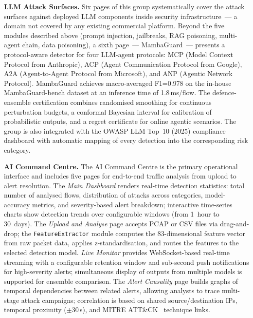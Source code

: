 \noindent\textbf{LLM Attack Surfaces.} Six pages of this group
systematically cover the attack surfaces against deployed LLM
components inside security infrastructure~--- a domain not
covered by any existing commercial platform. Beyond the five
modules described above (prompt injection, jailbreaks, RAG
poisoning, multi-agent chain, data poisoning), a sixth page~---
\textsf{MambaGuard}~--- presents a protocol-aware detector for
four LLM-agent protocols: MCP (Model Context Protocol from
Anthropic), ACP (Agent Communication Protocol from Google), A2A
(Agent-to-Agent Protocol from Microsoft), and ANP (Agentic
Network Protocol). \textsf{MambaGuard} achieves macro-averaged
F1=0.978 on the in-house MambaGuard-bench dataset at an inference
time of 1.8\,ms/flow. The defence-ensemble certification combines
randomised smoothing for continuous perturbation budgets, a
conformal Bayesian interval for calibration of probabilistic
outputs, and a regret certificate for online agentic scenarios.
The group is also integrated with the OWASP LLM Top~10 (2025)
compliance dashboard with automatic mapping of every detection
into the corresponding risk category.

\noindent\textbf{AI Command Centre.} The AI Command Centre is the
primary operational interface and includes five pages for
end-to-end traffic analysis from upload to alert resolution. The
\emph{Main Dashboard} renders real-time detection statistics:
total number of analysed flows, distribution of attacks across
categories, model-accuracy metrics, and severity-based alert
breakdown; interactive time-series charts show detection trends
over configurable windows (from 1~hour to 30~days). The
\emph{Upload and Analyse} page accepts PCAP or CSV files via
drag-and-drop; the \texttt{FeatureExtractor} module computes the
83-dimensional feature vector from raw packet data, applies
z-standardisation, and routes the features to the selected
detection model. \emph{Live Monitor} provides WebSocket-based
real-time streaming with a configurable retention window and
sub-second push notifications for high-severity alerts;
simultaneous display of outputs from multiple models is supported
for ensemble comparison. The \emph{Alert Causality} page builds
graphs of temporal dependencies between related alerts, allowing
analysts to trace multi-stage attack campaigns; correlation is
based on shared source/destination IPs, temporal proximity
($\pm$30\,s), and MITRE ATT\&CK~\cite{Hernandez2015} technique
links.

